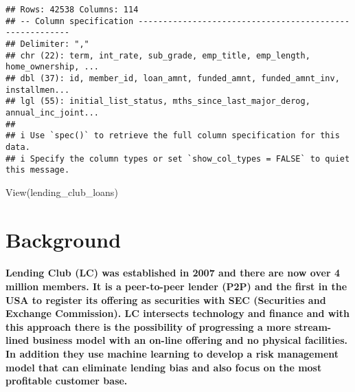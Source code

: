 \documentclass[
]{article}
\newenvironment{Shaded}{\begin{snugshade}}{\end{snugshade}}
\newcommand{\FunctionTok}[1]{\textcolor[rgb]{0.00,0.00,0.00}{#1}}
\newcommand{\NormalTok}[1]{#1}
\begin{document}
\begin{verbatim}
## Rows: 42538 Columns: 114
## -- Column specification --------------------------------------------------------
## Delimiter: ","
## chr (22): term, int_rate, sub_grade, emp_title, emp_length, home_ownership, ...
## dbl (37): id, member_id, loan_amnt, funded_amnt, funded_amnt_inv, installmen...
## lgl (55): initial_list_status, mths_since_last_major_derog, annual_inc_joint...
## 
## i Use `spec()` to retrieve the full column specification for this data.
## i Specify the column types or set `show_col_types = FALSE` to quiet this message.
\end{verbatim}

\begin{Shaded}
\begin{Highlighting}[]
\FunctionTok{View}\NormalTok{(lending\_club\_loans)}
\end{Highlighting}
\end{Shaded}

\hypertarget{background}{%
\section{Background}\label{background}}

\hypertarget{lending-club-lc-was-established-in-2007-and-there-are-now-over-4-million-members.-it-is-a-peer-to-peer-lender-p2p-and-the-first-in-the-usa-to-register-its-offering-as-securities-with-sec-securities-and-exchange-commission.-lc-intersects-technology-and-finance-and-with-this-approach-there-is-the-possibility-of-progressing-a-more-stream-lined-business-model-with-an-on-line-offering-and-no-physical-facilities.-in-addition-they-use-machine-learning-to-develop-a-risk-management-model-that-can-eliminate-lending-bias-and-also-focus-on-the-most-profitable-customer-base.}{%
\paragraph{Lending Club (LC) was established in 2007 and there are now
over 4 million members. It is a peer-to-peer lender (P2P) and the first
in the USA to register its offering as securities with SEC (Securities
and Exchange Commission). LC intersects technology and finance and with
this approach there is the possibility of progressing a more
stream-lined business model with an on-line offering and no physical
facilities. In addition they use machine learning to develop a risk
management model that can eliminate lending bias and also focus on the
most profitable customer
base.}\label{lending-club-lc-was-established-in-2007-and-there-are-now-over-4-million-members.-it-is-a-peer-to-peer-lender-p2p-and-the-first-in-the-usa-to-register-its-offering-as-securities-with-sec-securities-and-exchange-commission.-lc-intersects-technology-and-finance-and-with-this-approach-there-is-the-possibility-of-progressing-a-more-stream-lined-business-model-with-an-on-line-offering-and-no-physical-facilities.-in-addition-they-use-machine-learning-to-develop-a-risk-management-model-that-can-eliminate-lending-bias-and-also-focus-on-the-most-profitable-customer-base.}}
\end{document}

